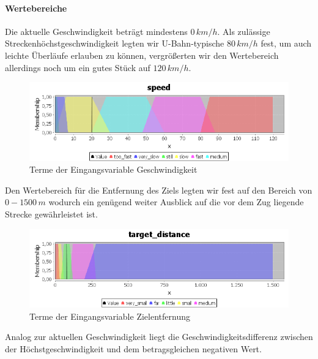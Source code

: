 \documentclass[10pt,a4paper]{article}
\begin{document}
\paragraph{Wertebereiche}
Die aktuelle Geschwindigkeit beträgt mindestens $ 0\, km/h $. Als zulässige Streckenhöchstgeschwindigkeit legten wir U-Bahn-typische $ 80\, km/h $ fest, um auch leichte Überläufe erlauben zu können, vergrößerten wir den Wertebereich allerdings noch um ein gutes Stück auf $ 120\, km/h $.

\begin{figure}[htb]
\begin{center}
\includegraphics[width=\textwidth]{var_speed.png}
\caption[Eingangsvariable Geschwindigkeit]{Terme der Eingangsvariable Geschwindigkeit}
\label{var_speed}
\end{center}
\end{figure}

Den Wertebereich für die Entfernung des Ziels legten wir fest auf den Bereich von $ 0 - 1500 \, m $ wodurch ein genügend weiter Ausblick auf die vor dem Zug liegende Strecke gewährleistet ist.

\begin{figure}[htb]
\begin{center}
\includegraphics[width=\textwidth]{var_target_distance.png}
\caption[Eingangsvariable Zielentfernung]{Terme der Eingangsvariable Zielentfernung}
\label{var_target_distance}
\end{center}
\end{figure}

Analog zur aktuellen Geschwindigkeit liegt die Geschwindigkeitsdifferenz zwischen der Höchstgeschwindigkeit und dem betragsgleichen negativen Wert.
\end{document}
